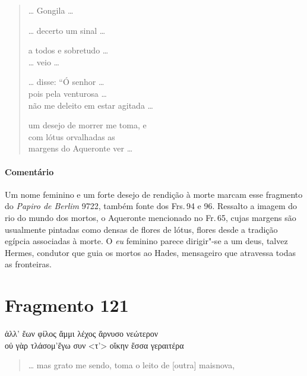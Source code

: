\begin{verse}
\ldots{} Gongila \ldots{}\\

\medskip

\ldots{} decerto um sinal \ldots{}\\

\medskip

a todos e sobretudo \ldots{}\\
\ldots{} veio \ldots{}\\

\medskip

\ldots{} disse: ``Ó senhor \ldots{}\\
pois pela venturosa \ldots{}\\
não me deleito em estar agitada \ldots{}\\

\medskip

um desejo de morrer me toma, e\\
com lótus orvalhadas as\\
margens do Aqueronte ver \ldots{}
\end{verse}

\medskip

{\paragraph{Comentário} Um nome feminino e um forte desejo de rendição à morte marcam esse fragmento do
\emph{Papiro de Berlim }9722, também fonte dos Frs.\,94 e 96. Ressalto a imagem do
rio do mundo dos mortos, o Aqueronte mencionado no Fr.\,65, cujas margens são usualmente pintadas
como densas de flores de lótus, flores desde a tradição egípcia associadas à morte. O \emph{eu} feminino parece dirigir"-se a um deus,
talvez Hermes, condutor que guia os mortos ao Hades, mensageiro que atravessa todas as fronteiras.}


\section{Fragmento 121}

\begin{gkverse}
ἀλλ’ ἔων φίλος ἄμμι λέχος ἄρνυσο νεώτερον\\
οὐ γὰρ τλάσομ’ἔγω συν <τ’> οἴκην ἔσσα γεραιτέρα
\end{gkverse}

\begin{verse}
\ldots{} mas grato me sendo, toma o leito de {[}outra{]} mais\qb{}nova,\\
\end{verse}

